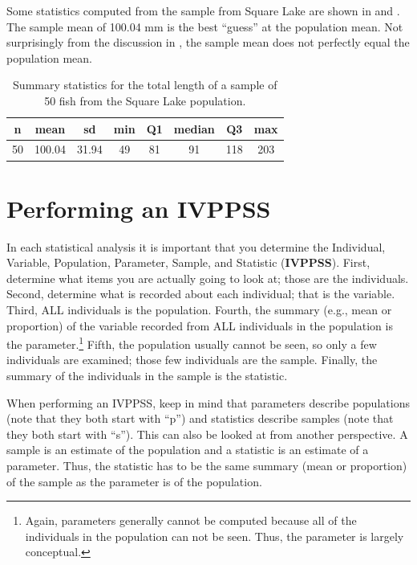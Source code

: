 \documentclass[10pt,openany]{book}\usepackage[]{graphicx}\usepackage[]{color}
\begin{document}
Some statistics computed from the sample from Square Lake are shown in  and . The sample mean of 100.04 mm is the best ``guess'' at the population mean. Not surprisingly from the discussion in , the sample mean does not perfectly equal the population mean.

\begin{table}[ht]
\centering
\caption{Summary statistics for the total length of a sample of 50 fish from the Square Lake population.} 
\label{tab:SquareLakeSample1}
\begin{tabular}{cccccccc}
 n & mean & sd & min & Q1 & median & Q3 & max \\ 
  \hline
50 & 100.04 & 31.94 & 49 & 81 & 91 & 118 & 203 \\ 
   \hline
\end{tabular}
\end{table}



\vspace{-12pt}


\section{Performing an IVPPSS}
\vspace{-12pt}
In each statistical analysis it is important that you determine the Individual, Variable, Population, Parameter, Sample, and Statistic (\textbf{IVPPSS}). First, determine what items you are actually going to look at; those are the individuals. Second, determine what is recorded about each individual; that is the variable. Third, ALL individuals is the population. Fourth, the summary (e.g., mean or proportion) of the variable recorded from ALL individuals in the population is the parameter.\footnote{Again, parameters generally cannot be computed because all of the individuals in the population can not be seen. Thus, the parameter is largely conceptual.} Fifth, the population usually cannot be seen, so only a few individuals are examined; those few individuals are the sample. Finally, the summary of the individuals in the sample is the statistic.

When performing an IVPPSS, keep in mind that parameters describe populations (note that they both start with ``p'') and statistics describe samples (note that they both start with ``s''). This can also be looked at from another perspective. A sample is an estimate of the population and a statistic is an estimate of a parameter. Thus, the statistic has to be the same summary (mean or proportion) of the sample as the parameter is of the population.
\end{document}
